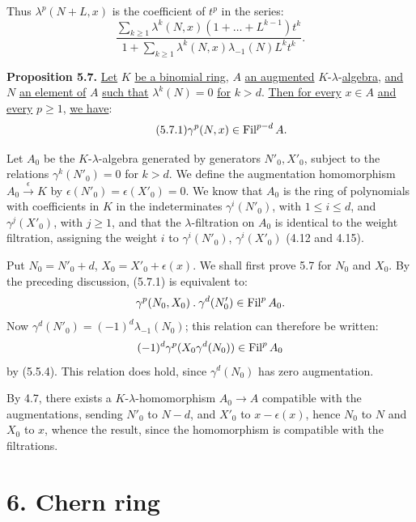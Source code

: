 %
Thus \(\lambda^p(N+L,x)\) is the coefficient of \(t^p\) in the series:
\[
  \frac{\displaystyle\sum_{k\ge1}\lambda^k(N,x)
        (1+\ldots+L^{k-1})t^k}
       {\displaystyle 1+\sum_{k\ge1}\lambda^k(N,x)
        \lambda_{-1}(N)L^k t^k}.
\]

\textbf{Proposition 5.7.} \uline{Let} \(K\) \uline{be a binomial ring}, \(A\) \uline{an augmented} \(K\)-\(\lambda\)-\uline{algebra}, \uline{and} \(N\) \uline{an element of} \(A\) \uline{such that} \(\lambda^k(N)=0\) \uline{for} \(k>d\). \uline{Then for every} \(x\in A\) \uline{and every} \(p\ge1\), \uline{we have}:
\begin{equation}\tag{5.7.1}
  \gamma^p(N,x)\in\operatorname{Fil}^{p-d}A.
\end{equation}

Let \(A_0\) be the \(K\)-\(\lambda\)-algebra generated by generators \(N'_0,X'_0\), subject to the relations \(\gamma^k(N'_0)=0\) for \(k>d\). We define the augmentation homomorphism \(A_0\xrightarrow{\epsilon}K\) by \(\epsilon(N'_0)=\epsilon(X'_0)=0\). We know that \(A_0\) is the ring of polynomials with coefficients in \(K\) in the indeterminates \(\gamma^i(N'_0)\), with \(1\le i\le d\), and \(\gamma^j(X'_0)\), with \(j\ge1\), and that the \(\lambda\)-filtration on \(A_0\) is identical to the weight filtration, assigning the weight \(i\) to \(\gamma^i(N'_0)\), \(\gamma^i(X'_0)\) (4.12 and 4.15).

Put \(N_0=N'_0+d\), \(X_0=X'_0+\epsilon(x)\). We shall first prove 5.7 for \(N_0\) and \(X_0\). By the preceding discussion, (5.7.1) is equivalent to:
\[
  \gamma^p(N_0,X_0)\mathbin{.}\gamma^d(N'_0)\in\operatorname{Fil}^pA_0.
\]
Now \(\gamma^d(N'_0)=(-1)^d\lambda_{-1}(N_0)\); this relation can therefore be written:
\[
  (-1)^d\gamma^p(X_0\gamma^d(N_0))\in\operatorname{Fil}^pA_0
\]
by (5.5.4). This relation does hold, since \(\gamma^d(N_0)\) has zero augmentation.

By 4.7, there exists a \(K\)-\(\lambda\)-homomorphism \(A_0\longrightarrow A\) compatible with the augmentations, sending \(N'_0\) to \(N-d\), and \(X'_0\) to \(x-\epsilon(x)\), hence \(N_0\) to \(N\) and \(X_0\)
%
to \(x\), whence the result, since the homomorphism is compatible with the filtrations.

\section*{6. Chern ring}

